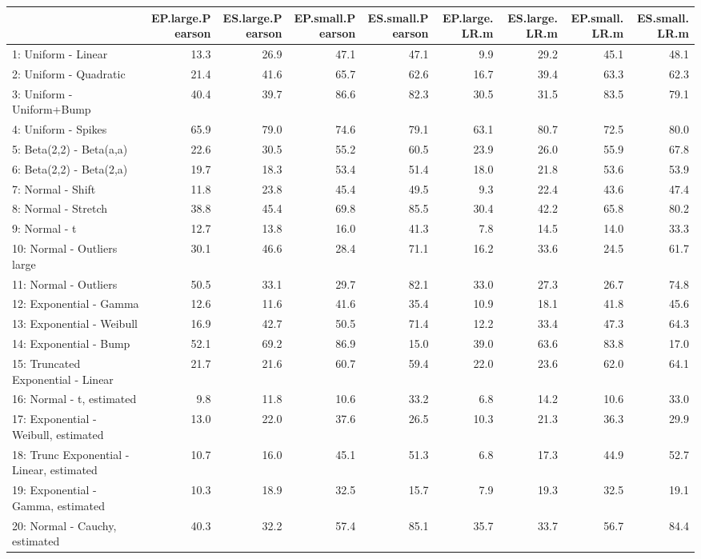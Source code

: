 \documentclass[
]{article}
\begin{document}
\begin{table}[H]
\centering\begingroup\fontsize{15}{17}\selectfont

\begin{tabular}{l|r|r|r|r|r|r|r|r}
\hline
  & EP.large.Pearson & ES.large.Pearson & EP.small.Pearson & ES.small.Pearson & EP.large.LR.m & ES.large.LR.m & EP.small.LR.m & ES.small.LR.m\\
\hline
1: Uniform - Linear & 13.3 & 26.9 & 47.1 & 47.1 & 9.9 & 29.2 & 45.1 & 48.1\\
\hline
2: Uniform - Quadratic & 21.4 & 41.6 & 65.7 & 62.6 & 16.7 & 39.4 & 63.3 & 62.3\\
\hline
3: Uniform - Uniform+Bump & 40.4 & 39.7 & 86.6 & 82.3 & 30.5 & 31.5 & 83.5 & 79.1\\
\hline
4: Uniform - Spikes & 65.9 & 79.0 & 74.6 & 79.1 & 63.1 & 80.7 & 72.5 & 80.0\\
\hline
5: Beta(2,2) - Beta(a,a) & 22.6 & 30.5 & 55.2 & 60.5 & 23.9 & 26.0 & 55.9 & 67.8\\
\hline
6: Beta(2,2) - Beta(2,a) & 19.7 & 18.3 & 53.4 & 51.4 & 18.0 & 21.8 & 53.6 & 53.9\\
\hline
7: Normal - Shift & 11.8 & 23.8 & 45.4 & 49.5 & 9.3 & 22.4 & 43.6 & 47.4\\
\hline
8: Normal  - Stretch & 38.8 & 45.4 & 69.8 & 85.5 & 30.4 & 42.2 & 65.8 & 80.2\\
\hline
9: Normal  - t & 12.7 & 13.8 & 16.0 & 41.3 & 7.8 & 14.5 & 14.0 & 33.3\\
\hline
10: Normal  - Outliers large & 30.1 & 46.6 & 28.4 & 71.1 & 16.2 & 33.6 & 24.5 & 61.7\\
\hline
11: Normal  - Outliers & 50.5 & 33.1 & 29.7 & 82.1 & 33.0 & 27.3 & 26.7 & 74.8\\
\hline
12: Exponential - Gamma & 12.6 & 11.6 & 41.6 & 35.4 & 10.9 & 18.1 & 41.8 & 45.6\\
\hline
13: Exponential - Weibull & 16.9 & 42.7 & 50.5 & 71.4 & 12.2 & 33.4 & 47.3 & 64.3\\
\hline
14: Exponential - Bump & 52.1 & 69.2 & 86.9 & 15.0 & 39.0 & 63.6 & 83.8 & 17.0\\
\hline
15: Truncated Exponential - Linear & 21.7 & 21.6 & 60.7 & 59.4 & 22.0 & 23.6 & 62.0 & 64.1\\
\hline
16: Normal  - t, estimated & 9.8 & 11.8 & 10.6 & 33.2 & 6.8 & 14.2 & 10.6 & 33.0\\
\hline
17: Exponential - Weibull, estimated & 13.0 & 22.0 & 37.6 & 26.5 & 10.3 & 21.3 & 36.3 & 29.9\\
\hline
18: Trunc Exponential - Linear, estimated & 10.7 & 16.0 & 45.1 & 51.3 & 6.8 & 17.3 & 44.9 & 52.7\\
\hline
19: Exponential - Gamma, estimated & 10.3 & 18.9 & 32.5 & 15.7 & 7.9 & 19.3 & 32.5 & 19.1\\
\hline
20: Normal  - Cauchy, estimated & 40.3 & 32.2 & 57.4 & 85.1 & 35.7 & 33.7 & 56.7 & 84.4\\
\hline
\end{tabular}
\endgroup{}
\end{table}
\end{document}
